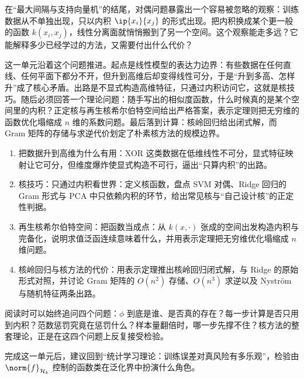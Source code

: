 在``最大间隔与支持向量机''的结尾，对偶问题暴露出一个容易被忽略的观察：训练数据从不单独出现，只以内积 \(\ip{x_i}{x_j}\) 的形式出现。把内积换成某个更一般的函数 \(k(x_i,x_j)\)，线性分离面就悄悄搬到了另一个空间。这个观察能走多远？它能解释多少已经学过的方法，又需要付出什么代价？

这一单元沿着这个问题推进。起点是线性模型的表达力边界：有些数据在任何直线、任何平面下都分不开，但升到高维后却变得线性可分，于是``升到多高、怎样升''成了核心矛盾。出路是不显式构造高维特征，只通过内积访问它，这就是核技巧。随后必须回答一个理论问题：随手写出的相似度函数，什么时候真的是某个空间里的内积？正定核与再生核希尔伯特空间给出严格答案，表示定理则把无穷维的函数优化塌缩成 \(n\) 维的系数问题。最后落到计算：核岭回归给出闭式解，而 Gram 矩阵的存储与求逆代价划定了朴素核方法的规模边界。

\begin{enumerate}
\def\labelenumi{\arabic{enumi}.}
\tightlist
\item
  把数据升到高维为什么有用：XOR 这类数据在低维线性不可分，显式特征映射让它可分，但维度爆炸使显式构造不可行，逼出``只算内积''的出路。
\item
  核技巧：只通过内积看世界：定义核函数，盘点 SVM 对偶、Ridge 回归的 Gram 形式与 PCA 中只依赖内积的环节，给出常见核与``自己设计核''的正定性判据。
\item
  再生核希尔伯特空间：把函数当成点：从 \(k(x,\cdot)\) 张成的空间出发构造内积与完备化，说明求值泛函连续意味着什么，并用表示定理把无穷维优化塌缩成 \(n\) 维问题。
\item
  核岭回归与核方法的代价：用表示定理推出核岭回归闭式解，与 Ridge 的原始形式对照，并讨论 Gram 矩阵的 \(O(n^2)\) 存储、\(O(n^3)\) 求逆以及 Nyström 与随机特征两条出路。
\end{enumerate}

阅读时可以始终追问四个问题：\(\phi\) 到底是谁、是否真的存在？每一步计算是否只用到内积？范数惩罚究竟在惩罚什么？样本量翻倍时，哪一步先撑不住？核方法的整套理论，正是在这四个问题上反复接受检验。

完成这一单元后，建议回到``统计学习理论：训练误差对真风险有多乐观''，检验由 \(\norm{f}_{\mathcal{H}_k}\) 控制的函数类在泛化界中扮演什么角色。
